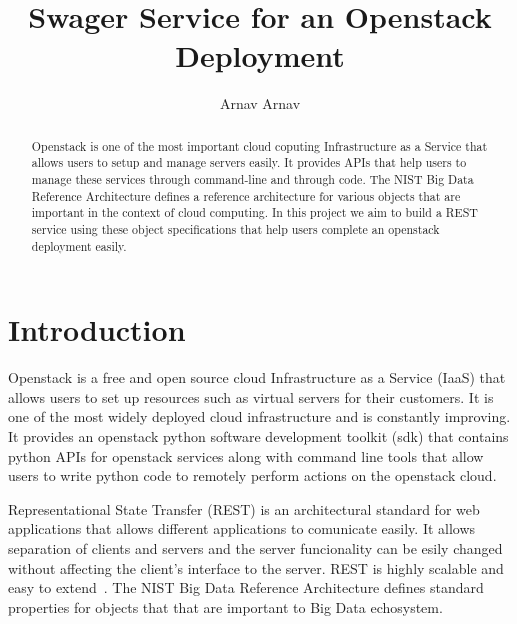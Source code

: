
\title{Swager Service for an Openstack Deployment}


\author{Arnav Arnav}


\renewcommand{\shortauthors}{Arnav}


\begin{abstract}
Openstack is one of the most important cloud coputing Infrastructure
as a Service that allows users to setup and manage servers easily. It
provides APIs that help users to manage these services through
command-line and through code. The NIST Big Data Reference
Architecture defines a reference architecture for various objects that
are important in the context of cloud computing. In this project we
aim to build a REST service using these object specifications that
help users complete an openstack deployment easily.
\end{abstract}



\maketitle

\section{Introduction}
Openstack is a free and open source cloud Infrastructure as a Service
(IaaS) that allows users to set up resources such as virtual servers for
their customers. It is one of the most widely deployed cloud
infrastructure and is constantly improving. It provides an openstack
python software development toolkit (sdk) that contains python APIs
for openstack services along with command line tools that allow users
to write python code to remotely perform actions on the openstack
cloud.

Representational State Transfer (REST) is an architectural standard
for web applications that allows different applications to comunicate
easily. It allows separation of clients and servers and the server
funcionality can be esily changed without affecting the client's
interface to the server. REST is highly scalable and easy to
extend~\cite{hid-sp18-503-REST}. The NIST Big Data Reference
Architecture defines standard properties for objects that that are
important to Big Data echosystem.

